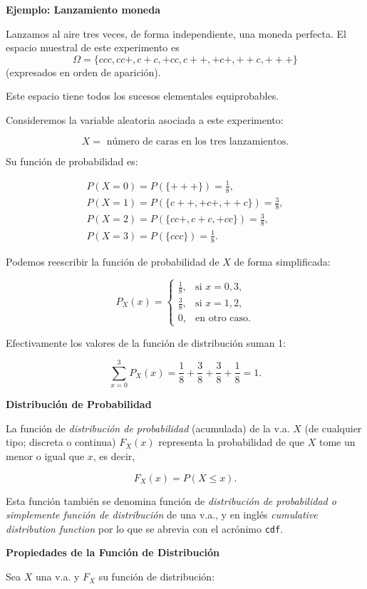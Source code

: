 \documentclass[]{book}
\begin{document}
\textbf{Ejemplo: Lanzamiento moneda}

Lanzamos al aire tres veces, de forma independiente, una moneda perfecta. El espacio muestral de este experimento es
\[\Omega=\{ccc,cc+,c+c,+cc,c++,+c+,++c,+++\}\] (expresados en orden de aparición).

Este espacio tiene todos los sucesos elementales equiprobables.

Consideremos la variable aleatoria asociada a este experimento:

\[X=\mbox{ número de caras en los tres lanzamientos}.\]

Su función de probabilidad es:

\[
\begin{array}{l}
P(X=0)=P(\{+++\})=\frac18,\\ P(X=1)=P(\{c++,+c+,++c\})=\frac38,\\
    P(X=2)=P(\{cc+,c+c,+cc\})=\frac38,\\
    P(X=3)=P(\{ccc\})=\frac18.
\end{array}
\]

Podemos reescribir la función de probabilidad de \(X\) de forma simplificada:

\[P_{X}(x)=\left\{\begin{array}{ll} \frac18, & \mbox{si } x=0, 3,\\[1ex]
\frac38, & \mbox{si } x=1,2,\\[1ex] 0, & \mbox{en otro caso.}\end{array}\right.\]

Efectivamente los valores de la función de distribución suman 1:

\[\sum_{x=0}^3 P_X(x)= \frac18+\frac38+\frac38+\frac18=1.\]

 \textbf{Distribución de Probabilidad}

La función de \emph{distribución de probabilidad} (acumulada) de la v.a. \(X\) (de cualquier tipo; discreta o continua) \(F_{X}(x)\) representa la probabilidad de que \(X\) tome un menor o igual que \(x\), es decir,

\[F_{X}(x)=P(X\leq x).\]

Esta función también se denomina función de \emph{distribución de
probabilidad o simplemente función de distribución} de una v.a., y en inglés
\emph{cumulative distribution function} por lo que se abrevia con el acrónimo \texttt{cdf}.

 \textbf{Propiedades de la Función de Distribución}

Sea \(X\) una v.a. y \(F_{X}\) su función de distribución:
\end{document}
